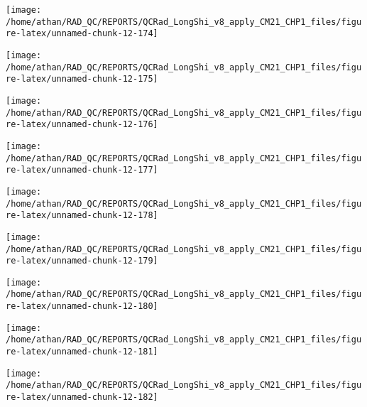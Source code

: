 \documentclass[
  10pt,
  a4paper,oneside]{article}
\begin{document}
\begin{center}\texttt{[image: /home/athan/RAD\_QC/REPORTS/QCRad\_LongShi\_v8\_apply\_CM21\_CHP1\_files/figure-latex/unnamed-chunk-12-174]} \end{center}

\begin{center}\texttt{[image: /home/athan/RAD\_QC/REPORTS/QCRad\_LongShi\_v8\_apply\_CM21\_CHP1\_files/figure-latex/unnamed-chunk-12-175]} \end{center}

\begin{center}\texttt{[image: /home/athan/RAD\_QC/REPORTS/QCRad\_LongShi\_v8\_apply\_CM21\_CHP1\_files/figure-latex/unnamed-chunk-12-176]} \end{center}

\begin{center}\texttt{[image: /home/athan/RAD\_QC/REPORTS/QCRad\_LongShi\_v8\_apply\_CM21\_CHP1\_files/figure-latex/unnamed-chunk-12-177]} \end{center}

\begin{center}\texttt{[image: /home/athan/RAD\_QC/REPORTS/QCRad\_LongShi\_v8\_apply\_CM21\_CHP1\_files/figure-latex/unnamed-chunk-12-178]} \end{center}

\begin{center}\texttt{[image: /home/athan/RAD\_QC/REPORTS/QCRad\_LongShi\_v8\_apply\_CM21\_CHP1\_files/figure-latex/unnamed-chunk-12-179]} \end{center}

\begin{center}\texttt{[image: /home/athan/RAD\_QC/REPORTS/QCRad\_LongShi\_v8\_apply\_CM21\_CHP1\_files/figure-latex/unnamed-chunk-12-180]} \end{center}

\begin{center}\texttt{[image: /home/athan/RAD\_QC/REPORTS/QCRad\_LongShi\_v8\_apply\_CM21\_CHP1\_files/figure-latex/unnamed-chunk-12-181]} \end{center}

\begin{center}\texttt{[image: /home/athan/RAD\_QC/REPORTS/QCRad\_LongShi\_v8\_apply\_CM21\_CHP1\_files/figure-latex/unnamed-chunk-12-182]} \end{center}
\end{document}
